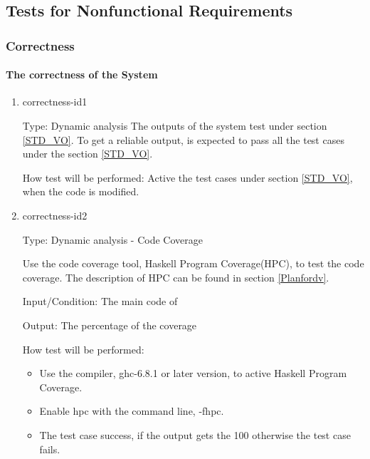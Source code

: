\documentclass[12pt, titlepage]{article}
\begin{document}
\subsection{Tests for Nonfunctional Requirements}

  \subsubsection{Correctness}
\paragraph{The correctness of the System}

\begin{enumerate} 

\item{correctness-id1\\} 

Type: Dynamic analysis
The outputs of the system test under section \ref{STD_VO}. To get a
reliable output, \progname is expected to pass all the test cases under the
section \ref{STD_VO}.

How test will be performed: Active the test cases under section
\ref{STD_VO}, when the code is modified.

\item{correctness-id2\\}

Type: Dynamic analysis - Code Coverage 

Use the code coverage tool, Haskell Program Coverage(HPC), to test the code
coverage. The description of HPC can be found in section \ref{Planfordv}.

Input/Condition: The main code of \progname

Output: The percentage of the coverage 

How test will be performed:

\begin{itemize} 
\item Use the compiler, ghc-6.8.1 or later version, to active Haskell Program
Coverage.
\item Enable hpc with the command line, -fhpc.
\item The test case success, if the output gets the 100%
otherwise
the test case fails. 
\end{itemize}
\end{enumerate} 
\end{document}

